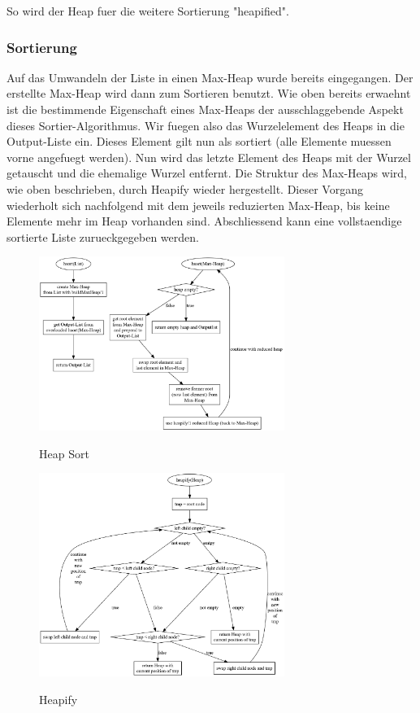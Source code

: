 \documentclass[11pt]{article}
\begin{document}
    So wird der Heap fuer die weitere Sortierung "heapified".

    \subsubsection{Sortierung}
    Auf das Umwandeln der Liste in einen Max-Heap wurde bereits eingegangen.
    Der erstellte Max-Heap wird dann zum Sortieren benutzt.
    Wie oben bereits erwaehnt ist die bestimmende Eigenschaft eines Max-Heaps der ausschlaggebende Aspekt dieses Sortier-Algorithmus.
    Wir fuegen also das Wurzelelement des Heaps in die Output-Liste ein.
    Dieses Element gilt nun als sortiert (alle Elemente muessen vorne angefuegt werden). 
    Nun wird das letzte Element des Heaps mit der Wurzel getauscht und die ehemalige Wurzel entfernt.
    Die Struktur des Max-Heaps wird, wie oben beschrieben, durch Heapify wieder hergestellt.
    Dieser Vorgang wiederholt sich nachfolgend mit dem jeweils reduzierten Max-Heap, bis keine Elemente mehr im Heap vorhanden sind.
    Abschliessend kann eine vollstaendige sortierte Liste zurueckgegeben werden.
    
    
    
    
    \begin{figure}[hbt]
        \caption{Heap Sort}
        \centering
        \includegraphics[width = 8cm]{hsort.pdf}\label{fig:hsort}
    \end{figure}

    \begin{figure}[hbt]
        \caption{Heapify}
        \centering
        \includegraphics[width = 8cm]{heapify.pdf}\label{fig:heapify}
    \end{figure}
    
\end{document}
